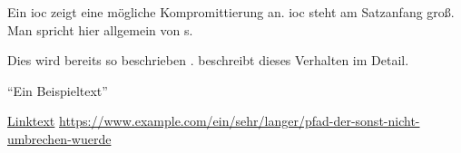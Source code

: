 Ein \gls{ioc} zeigt eine mögliche Kompromittierung an.
\Gls{ioc} steht am Satzanfang groß.   %
Man spricht hier allgemein von s.   %


Dies wird bereits so beschrieben \parencite{amazonAmazonComputeSLA2022}.
\textcite{amazonAmazonComputeSLA2022} beschreibt dieses Verhalten im Detail.


\enquote{Ein Beispieltext}


\href{https://www.example.com}{Linktext}   %
\url{https://www.example.com/ein/sehr/langer/pfad-der-sonst-nicht-umbrechen-wuerde}
